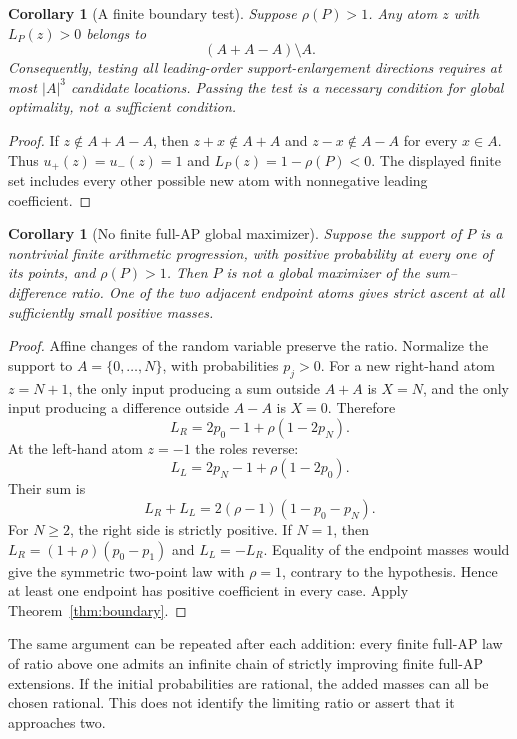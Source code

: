 \documentclass[11pt]{article}
\newtheorem{corollary}[theorem]{Corollary}
\theoremstyle{remark}
\begin{document}
\begin{corollary}[A finite boundary test]\label{cor:finite}
Suppose $\rho(P)>1$. Any atom $z$ with $L_P(z)>0$ belongs to
\[
 (A+A-A)\setminus A.
\]
Consequently, testing all leading-order support-enlargement directions
requires at most $|A|^3$ candidate locations. Passing the test is a
necessary condition for global optimality, not a sufficient condition.
\end{corollary}
\begin{proof}
If $z\notin A+A-A$, then $z+x\notin A+A$ and $z-x\notin A-A$ for
every $x\in A$. Thus $u_+(z)=u_-(z)=1$ and
$L_P(z)=1-\rho(P)<0$. The displayed finite set includes every other
possible new atom with nonnegative leading coefficient.
\end{proof}

\begin{corollary}[No finite full-AP global maximizer]\label{cor:AP}
Suppose the support of $P$ is a nontrivial finite arithmetic progression,
with positive probability at every one of its points, and $\rho(P)>1$.
Then $P$ is not a global maximizer of the sum--difference ratio. One of
the two adjacent endpoint atoms gives strict ascent at all sufficiently
small positive masses.
\end{corollary}
\begin{proof}
Affine changes of the random variable preserve the ratio. Normalize the
support to $A=\{0,\ldots,N\}$, with probabilities $p_j>0$. For a new
right-hand atom $z=N+1$, the only input producing a sum outside $A+A$ is
$X=N$, and the only input producing a difference outside $A-A$ is $X=0$.
Therefore
\[
 L_R=2p_0-1+\rho(1-2p_N).
\]
At the left-hand atom $z=-1$ the roles reverse:
\[
 L_L=2p_N-1+\rho(1-2p_0).
\]
Their sum is
\begin{equation}\label{eq:endpointsum}
 L_R+L_L=2(\rho-1)(1-p_0-p_N).
\end{equation}
For $N\geq2$, the right side is strictly positive. If $N=1$, then
$L_R=(1+\rho)(p_0-p_1)$ and $L_L=-L_R$. Equality of the endpoint masses
would give the symmetric two-point law with $\rho=1$, contrary to the
hypothesis. Hence at least one endpoint has positive coefficient in every
case. Apply Theorem~\ref{thm:boundary}.
\end{proof}
The same argument can be repeated after each addition: every finite
full-AP law of ratio above one admits an infinite chain of strictly
improving finite full-AP extensions. If the initial probabilities are
rational, the added masses can all be chosen rational. This does not
identify the limiting ratio or assert that it approaches two.
\end{document}
